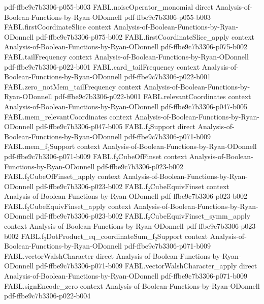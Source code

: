 \begin{theorem}
{    pdf-ffbe9c7b3306-p055-b003}
\proofstep
  {FABL.noiseOperator_monomial}
  {direct}
  {Analysis-of-Boolean-Functions-by-Ryan-ODonnell}
  {pdf-ffbe9c7b3306-p055-b003}
\proofstep
  {FABL.firstCoordinateSlice}
  {context}
  {Analysis-of-Boolean-Functions-by-Ryan-ODonnell}
  {pdf-ffbe9c7b3306-p075-b002}
\proofstep
  {FABL.firstCoordinateSlice_apply}
  {context}
  {Analysis-of-Boolean-Functions-by-Ryan-ODonnell}
  {pdf-ffbe9c7b3306-p075-b002}
\proofstep
  {FABL.tailFrequency}
  {context}
  {Analysis-of-Boolean-Functions-by-Ryan-ODonnell}
  {pdf-ffbe9c7b3306-p022-b001}
\proofstep
  {FABL.card_tailFrequency}
  {context}
  {Analysis-of-Boolean-Functions-by-Ryan-ODonnell}
  {pdf-ffbe9c7b3306-p022-b001}
\proofstep
  {FABL.zero_notMem_tailFrequency}
  {context}
  {Analysis-of-Boolean-Functions-by-Ryan-ODonnell}
  {pdf-ffbe9c7b3306-p022-b001}
\proofstep
  {FABL.relevantCoordinates}
  {context}
  {Analysis-of-Boolean-Functions-by-Ryan-ODonnell}
  {pdf-ffbe9c7b3306-p047-b005}
\proofstep
  {FABL.mem_relevantCoordinates}
  {context}
  {Analysis-of-Boolean-Functions-by-Ryan-ODonnell}
  {pdf-ffbe9c7b3306-p047-b005}
\proofstep
  {FABL.f₂Support}
  {direct}
  {Analysis-of-Boolean-Functions-by-Ryan-ODonnell}
  {pdf-ffbe9c7b3306-p071-b009}
\proofstep
  {FABL.mem_f₂Support}
  {context}
  {Analysis-of-Boolean-Functions-by-Ryan-ODonnell}
  {pdf-ffbe9c7b3306-p071-b009}
\proofstep
  {FABL.f₂CubeOfFinset}
  {context}
  {Analysis-of-Boolean-Functions-by-Ryan-ODonnell}
  {pdf-ffbe9c7b3306-p023-b002}
\proofstep
  {FABL.f₂CubeOfFinset_apply}
  {context}
  {Analysis-of-Boolean-Functions-by-Ryan-ODonnell}
  {pdf-ffbe9c7b3306-p023-b002}
\proofstep
  {FABL.f₂CubeEquivFinset}
  {context}
  {Analysis-of-Boolean-Functions-by-Ryan-ODonnell}
  {pdf-ffbe9c7b3306-p023-b002}
\proofstep
  {FABL.f₂CubeEquivFinset_apply}
  {context}
  {Analysis-of-Boolean-Functions-by-Ryan-ODonnell}
  {pdf-ffbe9c7b3306-p023-b002}
\proofstep
  {FABL.f₂CubeEquivFinset_symm_apply}
  {context}
  {Analysis-of-Boolean-Functions-by-Ryan-ODonnell}
  {pdf-ffbe9c7b3306-p023-b002}
\proofstep
  {FABL.f₂DotProduct_eq_coordinateSum_f₂Support}
  {context}
  {Analysis-of-Boolean-Functions-by-Ryan-ODonnell}
  {pdf-ffbe9c7b3306-p071-b009}
\proofstep
  {FABL.vectorWalshCharacter}
  {direct}
  {Analysis-of-Boolean-Functions-by-Ryan-ODonnell}
  {pdf-ffbe9c7b3306-p071-b009}
\proofstep
  {FABL.vectorWalshCharacter_apply}
  {direct}
  {Analysis-of-Boolean-Functions-by-Ryan-ODonnell}
  {pdf-ffbe9c7b3306-p071-b009}
\proofstep
  {FABL.signEncode_zero}
  {context}
  {Analysis-of-Boolean-Functions-by-Ryan-ODonnell}
  {pdf-ffbe9c7b3306-p022-b004}

\end{theorem}

